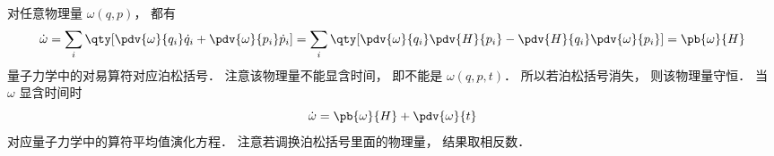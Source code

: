 
\begin{issues}
\issueDraft
\end{issues}


对任意物理量 $\omega (q,p)$，   都有
\begin{equation}
\dot \omega  = \sum_i \qty[ \pdv{\omega}{q_i} \dot q_i + \pdv{\omega}{p_i} \dot p_i ]  = \sum_i \qty[\pdv{\omega}{q_i} \pdv{H}{p_i} - \pdv{H}{q_i} \pdv{\omega}{p_i} ]  =  \pb{\omega}{H} 
\end{equation}
量子力学中的对易算符对应泊松括号． 注意该物理量不能显含时间， 即不能是 $\omega (q,p,t)$．  所以若泊松括号消失， 则该物理量守恒． 当 $\omega$ 显含时间时
\begin{equation}
\dot \omega  =  \pb{\omega}{H}  + \pdv{\omega}{t}
\end{equation}
对应量子力学中的算符平均值演化方程． 注意若调换泊松括号里面的物理量， 结果取相反数．
